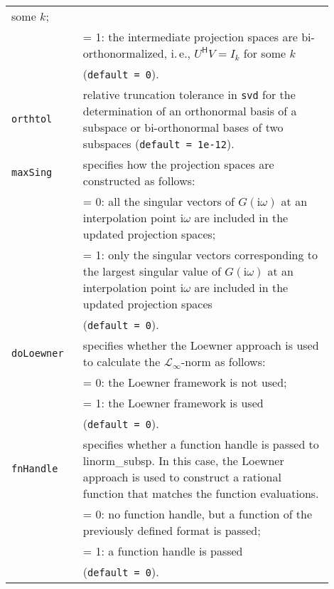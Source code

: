 \documentclass[10pt,a4paper]{article}
\begin{document}
\begin{longtable}{p{0.2\linewidth}p{0.7\linewidth}}
                         some $k$; \\
                       & = 1: the intermediate projection spaces are
                         bi-orthonormalized, i.\,e., $U^\mathsf{H} V = I_k$
                         for some $k$ \\
                       & (\texttt{default = 0}). \\ \hline
\texttt{orthtol}       & relative truncation tolerance in \texttt{svd} for the 
                         determination of an orthonormal basis of a
                         subspace or bi-orthonormal bases of two
                         subspaces (\texttt{default = 1e-12}). \\ \hline
\texttt{maxSing}       & specifies how the projection spaces are
                         constructed as follows: \\
                       & = 0: all the singular vectors of $G(\mathrm{i}\omega)$ at an 
                         interpolation point $\mathrm{i}\omega$ are included in
                         the updated projection spaces; \\
                       & = 1: only the singular vectors corresponding to
                         the largest singular value of $G(\mathrm{i}\omega)$ at an 
                         interpolation point $\mathrm{i}\omega$ are included in 
                         the updated projection spaces \\
                       & (\texttt{default = 0}). \\ \hline
\texttt{doLoewner}     & specifies whether the Loewner approach is
                         used to calculate the $\mathcal{L}_\infty$-norm as
                         follows: \\
                       & = 0: the Loewner framework is not used; \\
                       & = 1: the Loewner framework is used \\
                       & (\texttt{default = 0}). \\ \hline
\texttt{fnHandle}      & specifies whether a function handle is passed
                         to linorm\_subsp. In this case, the Loewner
                         approach is used to construct a rational 
                         function that matches the function evaluations. \\
                       & = 0: no function handle, but a function of the
                              previously defined format is passed; \\
                       & = 1: a function handle is passed \\
                       & (\texttt{default = 0}). \\ \hline
\end{longtable}
\end{document}
